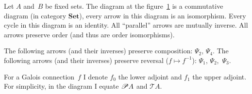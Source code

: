 \begin{thm}
\label{fcd-diagram}Let $A$ and~$B$ be fixed sets. The diagram at the figure~\ref{rels-dia} is
a commutative diagram (in category $\mathbf{Set}$), every arrow in
this diagram is an isomorphism. Every cycle in this diagram is an
identity. All ``parallel'' arrows are mutually inverse. All arrows preserve order (and thus are order isomorphisms).

The following arrows (and their inverses) preserve composition: $\Psi_2$, $\Psi_4$.
The following arrows (and their inverses) preserve reversal ($f\mapsto f^{-1}$): $\Psi_1$, $\Psi_2$,~$\Psi_3$.

For a Galois connection~$f$ I denote $f_0$ the lower adjoint and $f_1$ the upper adjoint.
For simplicity, in the diagram I equate $\mathscr{P} A$ and $\mathscr{T}A$.


\begin{figure}[ht]
\caption{\label{rels-dia}}


\end{figure}
\end{thm}
